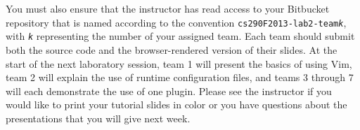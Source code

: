 You must also ensure that the instructor has read access to your Bitbucket repository that is named according to the
convention {\tt cs290F2013-lab2-team{\em k}}, with {\tt {\em k}} representing the number of your assigned team. 
Each team should submit both the source code and the browser-rendered version of their slides.  At the start of the next
laboratory session, team 1 will present the basics of using Vim, team 2 will explain the use of runtime configuration
files, and teams 3 through 7 will each demonstrate the use of one plugin.  Please see the instructor if you would like to
print your tutorial slides in color or you have questions about the presentations that you will give next week.


